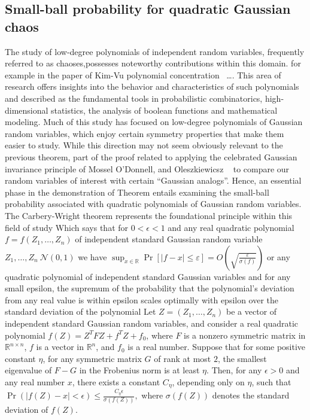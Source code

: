 \subsection{Small-ball probability for quadratic Gaussian chaos} 
The study of low-degree polynomials of independent random variables,
frequently referred to as chaoses,possesses noteworthy contributions within this domain.
for example in the paper of Kim-Vu polynomial concentration
~\cite{kim2000concentration}\dots. 
This area of research offers insights into the behavior and 
characteristics of such polynomials and described as the fundamental tools
in probabilistic combinatorics, high-dimensional statistics, the analysis
of boolean functions and mathematical modeling.
Much of this study has focused on low-degree polynomials of Gaussian random variables, which enjoy
certain symmetry properties that make them easier to study. While this direction may not seem obviously
relevant to the previous theorem,
part of the proof related to applying the celebrated 
Gaussian invariance principle of Mossel O'Donnell, and Oleszkiewicsz
~\cite{mossel2005noise}
to compare our random variables of interest with certain “Gaussian analogs”.
Hence, an essential phase in the demonstration of Theorem entails examining the small-ball
probability associated with quadratic polynomials of Gaussian random variables.
The Carbery-Wright theorem represents the foundational principle within this field of study
Which says that for $ 0 < \epsilon < 1 $ and any real quadratic polynomial $f=f(Z_1,\dots,Z_n)$ 
of independent standard Gaussian random variable $Z_1,\dots,Z_n ~ \mathcal{N}(0,1)$ 
we have $\sup_{x \in \mathbb{R}} \Pr[|f - x| \leq \varepsilon] = O\left(\sqrt{\frac{\varepsilon}{\sigma(f)}}\right)$
or any quadratic polynomial of 
independent standard Gaussian variables and for any small epsilon,
the supremum of the probability that the polynomial's
deviation from any real value is within epsilon scales optimally
with epsilon over the standard deviation of the polynomial
Let $Z = (Z_1, \ldots, Z_n)$ be a vector of independent standard Gaussian random variables,
and consider a real quadratic polynomial
$f(Z) = Z^T F Z + f^T Z + f_0$, where $F$ is a nonzero symmetric matrix in
$\mathbb{R}^{n \times n}$, $f$ is a vector in $\mathbb{R}^n$, and $f_0$ is a real number.
Suppose that for some positive constant $\eta$, for any symmetric matrix $G$ of rank at most $2$,
the smallest eigenvalue of $F - G$ in the Frobenius norm is at least $\eta$. Then, for any $\epsilon > 0$ 
and any real number $x$, there exists a constant $C_{\eta}$, depending only on $\eta$, such that
$
\Pr\left( |f(Z) - x| < \epsilon \right) \leq \frac{C_{\eta} \epsilon}{\sigma(f(Z))},
$
where $\sigma(f(Z))$ denotes the standard deviation of $f(Z)$.

